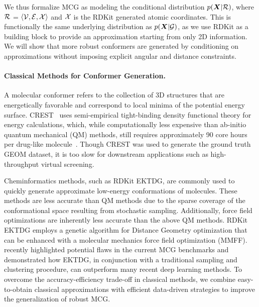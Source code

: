 We thus formalize MCG as modeling the conditional distribution $p({\bm{X}} | {\mathcal{R}})$, where ${\mathcal{R}}$ = $\langle {\mathcal{V}}, {\mathcal{E}}, {\mathcal{X}} \rangle$ and ${\mathcal{X}}$ is the RDKit generated atomic coordinates. This is functionally the same underlying distribution as $p({\bm{X}} | {\mathcal{G}})$, as we use RDKit as a building block to provide an approximation starting from only 2D information.
We will show that more robust conformers are generated by conditioning on approximations without imposing explicit angular and distance constraints. 

\vspace{-1ex}
\paragraph{Classical Methods for Conformer Generation.} A molecular conformer refers to the collection of 3D structures that are energetically favorable and correspond to local minima of the potential energy surface.
CREST~\citep{CREST} uses semi-empirical tight-binding density functional theory for energy calculations, which, while computationally less expensive than ab-initio quantum mechanical (QM) methods, still requires approximately 90 core hours per drug-like molecule~\citep{GEOM}. Though CREST was used to generate the ground truth GEOM dataset, it is too slow for downstream applications such as high-throughput virtual screening.

Cheminformatics methods, such as RDKit EKTDG, are commonly used to quickly generate approximate low-energy conformations of molecules. 
These methods are less accurate than QM methods due to the sparse coverage of the conformational space resulting from stochastic sampling. 
Additionally, force field optimizations are inherently less accurate than the above QM methods. RDKit EKTDG employs a genetic algorithm for Distance Geometry optimization that can be enhanced with a molecular mechanics force field optimization (MMFF).
\citet{rdkit-cluster} recently highlighted potential flaws in the current MCG benchmarks and demonstrated how EKTDG, in conjunction with a traditional sampling and clustering procedure, can outperform many recent deep learning methods.
To overcome the accuracy-efficiency trade-off in classical methods, we combine easy-to-obtain classical approximations with efficient data-driven strategies to improve the generalization of robust MCG.
\vspace{-1ex}
